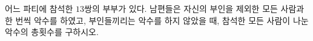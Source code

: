 어느 파티에 참석한 $13$쌍의 부부가 있다. 남편들은 자신의 부인을 제외한 모든 사람과 한 번씩 악수를 하였고, 부인들끼리는 악수를 하지 않았을 때, 참석한 모든 사람이 나눈 악수의 총횟수를 구하시오.
